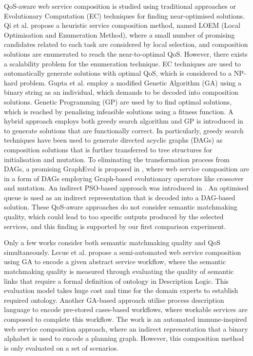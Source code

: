 \documentclass{llncs}
\begin{document}
QoS-aware web service composition is studied using traditional approaches or Evolutionary Computation (EC) techniques for finding near-optimised solutions. Qi et al. \cite{qi2010combining} propose a heuristic service composition method, named LOEM (Local Optimisation and Enumeration Method), where a small number of promising candidates related to each task are considered by local selection, and composition solutions are enumerated to reach the near-to-optimal QoS. However, there exists a scalability problem for the enumeration technique. EC techniques are used to automatically generate solutions with optimal QoS, which is considered to a NP-hard problem. Gupta et al. \cite{gupta2015optimization} employ a modified Genetic Algorithm (GA) using a binary string as an individual, which demands to be decoded into composition solutions. Genetic Programming (GP) are used by \cite{yu2013adaptive} to find optimal solutions, which is reached by penalising infeasible solutions using a fitness function. A hybrid approach employs both greedy search algorithm and GP is introduced in \cite{ma2015hybrid} to generate solutions that are functionally correct. In particularly, greedy search techniques have been used to generate directed acyclic graphs (DAGs) as composition solutions that is further transferred to tree structures for initialisation and mutation. To eliminating the transformation process from DAGs, a promising GraphEvol is proposed in \cite{da2015graphevol}, where web service composition are in a form of DAGs employing Graph-based evolutionary operators like crossover and mutation. An indirect PSO-based approach was introduced in \cite{da2016particle}. An optimised queue is used as an indirect representation that is decoded into a DAG-based solution. These QoS-aware approaches \cite{gupta2015optimization,qi2010combining,ma2015hybrid,da2016particle,da2015graphevol,yu2013adaptive} do not consider semantic matchmaking quality, which could lead to too specific outputs produced by the selected services, and this finding is supported by our first comparison experiment.

Only a few works \cite{fanjiang2014semantic,lecue2009optimizing,pop2009immune} consider both semantic matchmaking quality and QoS simultaneously. Lecue et al. \cite{lecue2009optimizing} propose a semi-automated web service composition using GA to encode a given abstract service workflow, where the semantic matchmaking quality is measured through evaluating the quality of semantic links that require a formal definition of ontology in Description Logic. This evaluation model takes huge cost and time for the domain experts to establish required ontology. Another GA-based approach \cite{fanjiang2014semantic} utilise process description language to encode pre-stored cases-based workflows, where workable services are composed to complete this workflow. The work \cite{pop2009immune} is an automated immune-inspired web service composition approach, where an indirect representation that a binary alphabet is used to encode a planning graph. However, this composition method is only evaluated on a set of scenarios.
\end{document}
